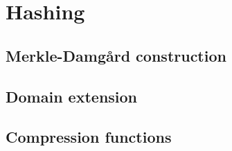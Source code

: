 \section{Hashing}


\subsection{Merkle-Damg\r{a}rd construction}

\subsection{Domain extension}


\subsection{Compression functions}

